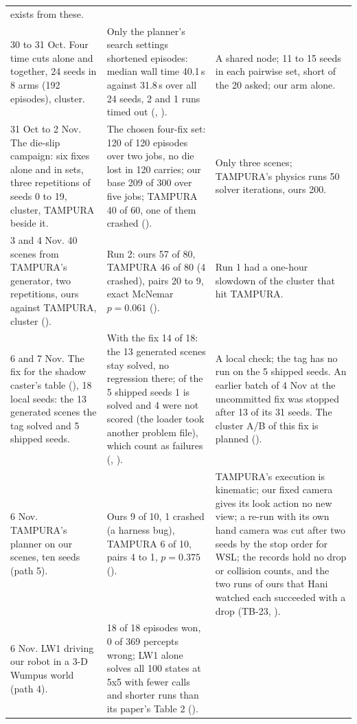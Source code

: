 \begin{small}
\begin{longtable}{@{}P{0.30\textwidth}P{0.36\textwidth}P{0.28\textwidth}@{}}
exists from these. \\
30 to 31 Oct. Four time cuts alone and together, 24 seeds in 8 arms (192
episodes), cluster. &
Only the planner's search settings shortened episodes: median wall time 40.1\,s
against 31.8\,s over all 24 seeds, 2 and 1 runs timed out (, ). &
A shared node; 11 to 15 seeds in each pairwise set, short of the 20 asked; our arm
alone. \\
31 Oct to 2 Nov. The die-slip campaign: six fixes alone and in sets, three
repetitions of seeds 0 to 19, cluster, TAMPURA beside it. &
The chosen four-fix set: 120 of 120 episodes over two jobs, no die lost in 120
carries; our base 209 of 300 over five jobs; TAMPURA 40 of 60, one of
them crashed (). &
Only three scenes; TAMPURA's physics runs 50 solver iterations, ours 200. \\
3 and 4 Nov. 40 scenes from TAMPURA's generator, two repetitions, ours against
TAMPURA, cluster (). &
Run 2: ours 57 of 80, TAMPURA 46 of 80 (4 crashed), pairs 20 to 9, exact McNemar
$p = 0.061$ (). &
Run 1 had a one-hour slowdown of the cluster that hit TAMPURA. \\
6 and 7 Nov. The fix for the shadow caster's table (), 18 local seeds:
the 13 generated scenes the tag solved and 5 shipped seeds. &
With the fix 14 of 18: the 13 generated scenes stay solved, no regression there; of the
5 shipped seeds 1 is solved and 4 were not scored (the loader took another problem file),
which count as failures (, ). &
A local check; the tag has no run on the 5 shipped seeds. An earlier batch of 4 Nov at
the uncommitted fix was stopped after 13 of its 31 seeds. The cluster A/B of this fix is
planned (). \\
6 Nov. TAMPURA's planner on our scenes, ten seeds (path 5). &
Ours 9 of 10, 1 crashed (a harness bug), TAMPURA 6 of 10, pairs 4 to 1, $p = 0.375$
(). &
TAMPURA's execution is kinematic; our fixed camera gives its look action no new
view; a re-run with its own hand camera was cut after two seeds by the stop order
for WSL; the records hold no drop or collision counts, and the two runs of ours that
Hani watched each succeeded with a drop (TB-23, ). \\
6 Nov. LW1 driving our robot in a 3-D Wumpus world (path 4). &
18 of 18 episodes won, 0 of 369 percepts wrong; LW1 alone solves all 100 states at
5x5 with fewer calls and shorter runs than its paper's Table 2 (). &

\end{longtable}
\end{small}
